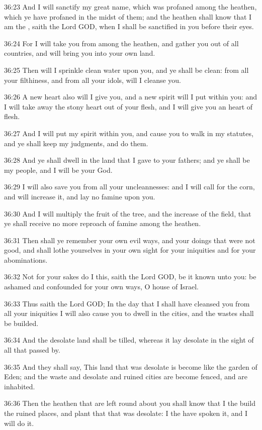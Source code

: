 36:23 And I will sanctify my great name, which was profaned among the heathen, which ye have profaned in the midst of them; and the heathen shall know that I am the \LORD, saith the Lord GOD, when I shall be sanctified in you before their eyes.

36:24 For I will take you from among the heathen, and gather you out of all countries, and will bring you into your own land.

36:25 Then will I sprinkle clean water upon you, and ye shall be clean: from all your filthiness, and from all your idols, will I cleanse you.

36:26 A new heart also will I give you, and a new spirit will I put within you: and I will take away the stony heart out of your flesh, and I will give you an heart of flesh.

36:27 And I will put my spirit within you, and cause you to walk in my statutes, and ye shall keep my judgments, and do them.

36:28 And ye shall dwell in the land that I gave to your fathers; and ye shall be my people, and I will be your God.

36:29 I will also save you from all your uncleannesses: and I will call for the corn, and will increase it, and lay no famine upon you.

36:30 And I will multiply the fruit of the tree, and the increase of the field, that ye shall receive no more reproach of famine among the heathen.

36:31 Then shall ye remember your own evil ways, and your doings that were not good, and shall lothe yourselves in your own sight for your iniquities and for your abominations.

36:32 Not for your sakes do I this, saith the Lord GOD, be it known unto you: be ashamed and confounded for your own ways, O house of Israel.

36:33 Thus saith the Lord GOD; In the day that I shall have cleansed you from all your iniquities I will also cause you to dwell in the cities, and the wastes shall be builded.

36:34 And the desolate land shall be tilled, whereas it lay desolate in the sight of all that passed by.

36:35 And they shall say, This land that was desolate is become like the garden of Eden; and the waste and desolate and ruined cities are become fenced, and are inhabited.

36:36 Then the heathen that are left round about you shall know that I the \LORD build the ruined places, and plant that that was desolate: I the \LORD have spoken it, and I will do it.

